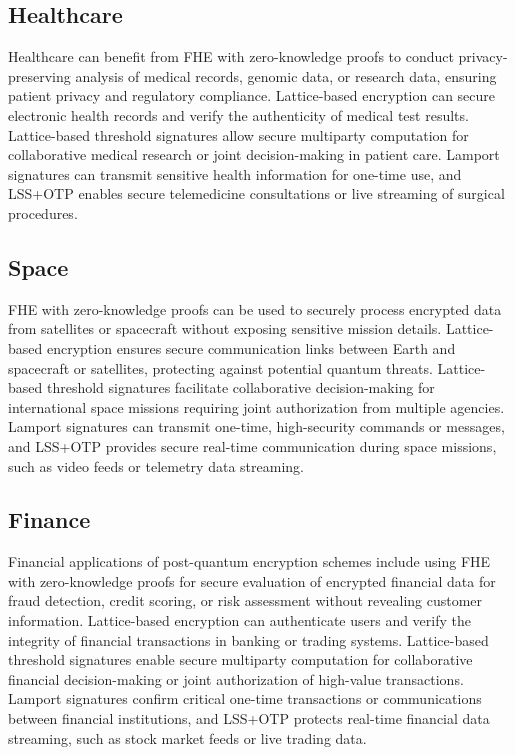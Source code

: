 \documentclass[11pt]{article}
\begin{document}
\subsection{Healthcare}

Healthcare can benefit from FHE with zero-knowledge proofs to conduct privacy-preserving analysis of medical records, genomic data, or research data, ensuring patient privacy and regulatory compliance. Lattice-based encryption can secure electronic health records and verify the authenticity of medical test results. Lattice-based threshold signatures allow secure multiparty computation for collaborative medical research or joint decision-making in patient care. Lamport signatures can transmit sensitive health information for one-time use, and LSS+OTP enables secure telemedicine consultations or live streaming of surgical procedures.


\subsection{Space}

FHE with zero-knowledge proofs can be used to securely process encrypted data from satellites or spacecraft without exposing sensitive mission details. Lattice-based encryption ensures secure communication links between Earth and spacecraft or satellites, protecting against potential quantum threats. Lattice-based threshold signatures facilitate collaborative decision-making for international space missions requiring joint authorization from multiple agencies. Lamport signatures can transmit one-time, high-security commands or messages, and LSS+OTP provides secure real-time communication during space missions, such as video feeds or telemetry data streaming.


\subsection{Finance}

Financial applications of post-quantum encryption schemes include using FHE with zero-knowledge proofs for secure evaluation of encrypted financial data for fraud detection, credit scoring, or risk assessment without revealing customer information. Lattice-based encryption can authenticate users and verify the integrity of financial transactions in banking or trading systems. Lattice-based threshold signatures enable secure multiparty computation for collaborative financial decision-making or joint authorization of high-value transactions. Lamport signatures confirm critical one-time transactions or communications between financial institutions, and LSS+OTP protects real-time financial data streaming, such as stock market feeds or live trading data.
\end{document}
